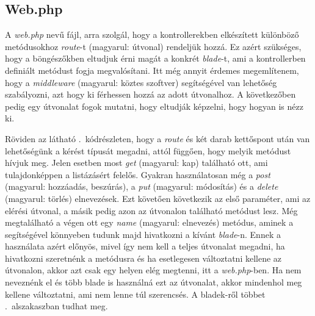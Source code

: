 \documentclass[]{thesis-ekf}
\theoremstyle{definition}
\theoremstyle{remark}
\begin{document}
	\subsection{Web.php}
		A \emph{web.php} nevű fájl, arra szolgál, hogy a kontrollerekben elkészített különböző metódusokhoz \emph{route}-t (magyarul: útvonal) rendeljük hozzá. Ez azért szükséges, hogy a böngészőkben eltudjuk érni magát a konkrét \emph{blade}-t, ami a kontrollerben definiált metódust fogja megvalósítani. Itt még annyit érdemes megemlítenem, hogy a \emph{middleware} (magyarul: köztes szoftver) segítségével van lehetőség szabályozni, azt hogy ki férhessen hozzá az adott útvonalhoz. A következőben pedig egy útvonalat fogok mutatni, hogy eltudják képzelni, hogy hogyan is nézz ki.
	
		
	
		Röviden az látható .~kódrészleten, hogy a \emph{route} és két darab kettőspont után van lehetőségünk a kérést típusát megadni, attól függően, hogy melyik metódust hívjuk meg. Jelen esetben most \emph{get} (magyarul: kap) található ott, ami tulajdonképpen a listázásért felelős. Gyakran használatosan még a \emph{post} (magyarul: hozzáadás, beszúrás), a \emph{put} (magyarul: módosítás) és a \emph{delete} (magyarul: törlés) elnevezések. Ezt követően következik az első paraméter, ami az elérési útvonal, a másik pedig azon az útvonalon található metódust lesz. Még megtalálható a végen ott egy \emph{name} (magyarul: elnevezés) metódus, aminek a segítségével könnyeben tudunk majd hivatkozni a kívánt \emph{blade}-n. Ennek a használata azért előnyös, mivel így nem kell a teljes útvonalat megadni, ha hivatkozni szeretnénk a metódusra és ha esetlegesen változtatni kellene az útvonalon, akkor azt csak egy helyen elég megtenni, itt a \emph{web.php}-ben. Ha nem neveznénk el és több blade is használná ezt az útvonalat, akkor mindenhol meg kellene változtatni, ami nem lenne túl szerencsés. A bladek-ről többet .~alszakaszban tudhat meg.
		
\end{document}
